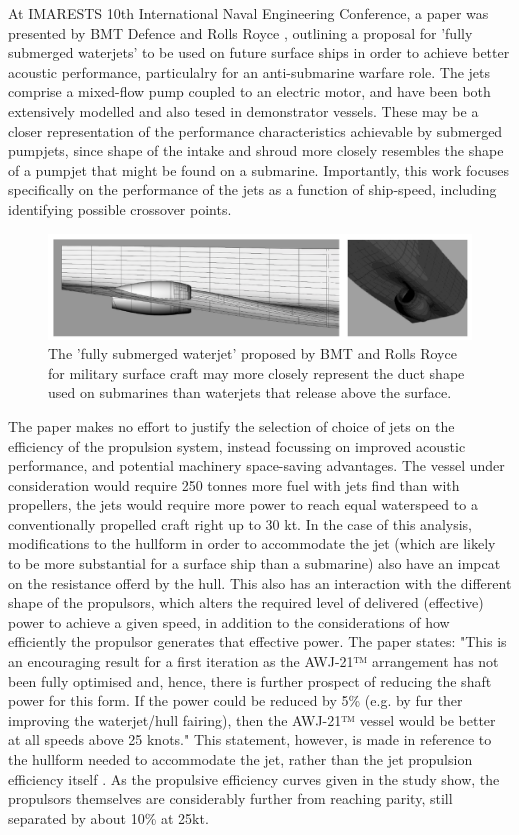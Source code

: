 \documentclass{article}\usepackage[]{graphicx}\usepackage[]{color}
\begin{document}
At IMARESTS 10th International Naval Engineering Conference, a paper was presented by BMT Defence and Rolls Royce \parencite{giles2010}, outlining a proposal for 'fully submerged waterjets' to be used on future surface ships in order to achieve better acoustic performance, particulalry for an anti-submarine warfare role. The jets comprise a mixed-flow pump coupled to an electric motor, and have been both extensively modelled and also tesed in demonstrator vessels.  These may be a closer representation of the performance characteristics achievable by submerged pumpjets, since shape of the intake and shroud more closely resembles the shape of a pumpjet that might be found on a submarine.  Importantly, this work focuses specifically on the performance of the jets as a function of ship-speed, including identifying possible crossover points.

\begin{figure}
\includegraphics[width=\textwidth]{BMTShape.png}
\caption{The 'fully submerged waterjet' proposed by BMT and Rolls Royce for military surface craft may more closely represent the duct shape used on submarines than waterjets that release above the surface. \parencite{giles2010}}
\label{fig:BMTShape.png}
\end{figure}

The paper makes no effort to justify the selection of choice of jets on the efficiency of the propulsion system, instead focussing on improved acoustic performance, and potential machinery space-saving advantages.  The vessel under consideration would require 250 tonnes more fuel with jets find than with propellers, the jets would require more power to reach equal waterspeed to a conventionally propelled craft right up to 30 kt.  In the case of this analysis, modifications to the hullform in order to accommodate the jet (which are likely to be more substantial for a surface ship than a submarine) also have an impcat on the resistance offerd by the hull.  This also has an interaction with the different shape of the propulsors, which alters the required level of delivered (effective) power to achieve a given speed, in addition to the considerations of how efficiently the propulsor generates that effective power. The paper states: "This is an encouraging result for a first iteration as the AWJ-21™ arrangement has not been fully optimised and, hence, there is further prospect of reducing the shaft power for this form. If the power could be reduced by 5\% (e.g. by fur ther improving the waterjet/hull fairing), then the AWJ-21™ vessel would be better at all speeds above 25 knots."  This statement, however, is made in reference to the hullform needed to accommodate the jet, rather than the jet propulsion efficiency itself \parencite{giles2010}.  As the propulsive efficiency curves given in the study show, the propulsors themselves are considerably further from reaching parity, still separated by about 10\% at 25kt.
\end{document}
